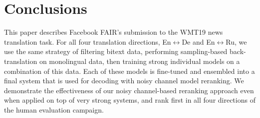 \documentclass[11pt,a4paper]{article}
\newcommand{\enbide}{En$\leftrightarrow$De}
\newcommand{\enbiru}{En$\leftrightarrow$Ru}
\begin{document}
\section{Conclusions}
This paper describes Facebook FAIR's submission to the WMT19 news translation task.
For all four translation directions, \enbide{} and \enbiru{}, we use the same strategy of filtering bitext data, performing sampling-based back-translation on monolingual data, then training strong individual models on a combination of this data.
Each of these models is fine-tuned and ensembled into a final system that is used for decoding with noisy channel model reranking.
We demonstrate the effectiveness of our noisy channel-based reranking approach even when applied on top of very strong systems, and rank first in all four directions of the human evaluation campaign.

 


\end{document}

